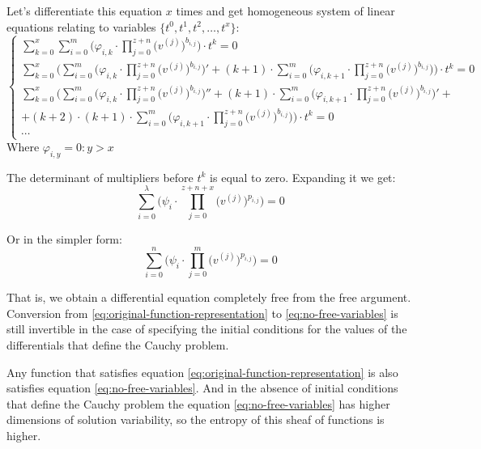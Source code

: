 \documentclass[a4paper, 11pt, oneside]{book}
\begin{document}
Let's differentiate this equation $x$ times and get homogeneous system of linear equations relating to variables $\{t^0, t^1, t^2, \ldots, t^x\}$:
\begin{equation}\label{eq:SE-with-free-argument}
  \begin{cases}
    \displaystyle \sum_{k = 0}^x \sum_{i = 0}^m\bigg(\varphi_{i, k} \cdot \prod_{j=0}^{z + n} \Big(v^{(j)}\Big)^{b_{i, j}}\bigg) \cdot t^k = 0 \\
    \displaystyle \sum_{k = 0}^x \Bigg(\sum_{i = 0}^m\bigg(\varphi_{i, k} \cdot \prod_{j=0}^{z + n} \Big(v^{(j)}\Big)^{b_{i, j}}\bigg)' + (k + 1) \cdot \sum_{i = 0}^m\bigg(\varphi_{i, k+1} \cdot \prod_{j=0}^{z + n} \Big(v^{(j)}\Big)^{b_{i, j}}\bigg) \Bigg) \cdot t^k = 0 \\
    \displaystyle \sum_{k = 0}^x \Bigg(\sum_{i = 0}^m\bigg(\varphi_{i, k} \cdot \prod_{j=0}^{z + n} \Big(v^{(j)}\Big)^{b_{i, j}}\bigg)'' + (k + 1) \cdot \sum_{i = 0}^m\bigg(\varphi_{i, k+1} \cdot \prod_{j=0}^{z + n} \Big(v^{(j)}\Big)^{b_{i, j}}\bigg)' + \\ + (k + 2) \cdot (k + 1) \cdot \sum_{i = 0}^m\bigg(\varphi_{i, k+1} \cdot \prod_{j=0}^{z + n} \Big(v^{(j)}\Big)^{b_{i, j}}\bigg) \Bigg) \cdot t^k = 0 \\
    \cdots
  \end{cases}
\end{equation}
Where $\varphi_{i, y} = 0: y > x$

The determinant of multipliers before $t^k$ is equal to zero. Expanding it we get:
\begin{equation}\label{eq:no-free-variables-long}
  \sum_{i = 0}^\lambda\bigg(\psi_i \cdot \prod_{j=0}^{z + n + x} \Big(v^{(j)}\Big)^{p_{i, j}}\bigg) = 0
\end{equation}

Or in the simpler form:
\begin{equation}\label{eq:no-free-variables}
  \sum_{i = 0}^n\bigg(\psi_i \cdot \prod_{j=0}^m \Big(v^{(j)}\Big)^{p_{i, j}}\bigg) = 0
\end{equation}

That is, we obtain a differential equation completely free from the free argument. Conversion from \ref{eq:original-function-representation} to \ref{eq:no-free-variables} is still invertible in the case of specifying the initial conditions for the values of the differentials that define the Cauchy problem.

Any function that satisfies equation \ref{eq:original-function-representation} is also satisfies equation \ref{eq:no-free-variables}. And in the absence of initial conditions that define the Cauchy problem the equation \ref{eq:no-free-variables} has higher dimensions of solution variability, so the entropy of this sheaf of functions is higher.
\end{document}
